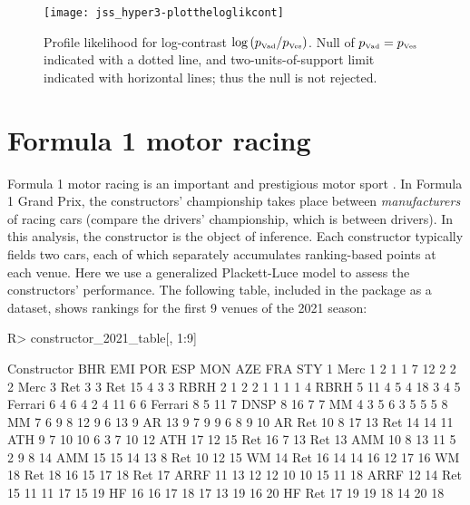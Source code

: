 \documentclass[article]{jss}
\begin{document}
\begin{figure}[t!]
\centering
\texttt{[image: jss\_hyper3-plottheloglikcont]}
\caption{Profile \label{profliklogcont} likelihood for log-contrast
$\log\left(p_{\mbox{\tiny Vad}}/ p_{\mbox{\tiny Ves}}\right)$.  Null
of $p_{\mbox{\tiny Vad}}=p_{\mbox{\tiny Ves}}$ indicated with a dotted
line, and two-units-of-support limit indicated with horizontal lines;
thus the null is not rejected.}
\end{figure}

\section{Formula 1 motor racing}\label{f1}

Formula 1 motor racing is an important and prestigious motor sport
\citep{codling2017,jenkins2010}.  In Formula 1 Grand Prix, the
constructors' championship takes place between {\em manufacturers} of
racing cars (compare the drivers' championship, which is between
drivers).  In this analysis, the constructor is the object of
inference.  Each constructor typically fields two cars, each of which
separately accumulates ranking-based points at each venue.  Here we
use a generalized Plackett-Luce model to assess the constructors'
performance.  The following table, included in the 
package as a dataset, shows rankings for the first 9 venues of the
2021 season:
%
\begin{Schunk}
\begin{Sinput}
R> constructor_2021_table[, 1:9]
\end{Sinput}
\begin{Soutput}
   Constructor BHR EMI POR ESP  MON AZE FRA STY
1         Merc   1   2   1   1    7  12   2   2
2         Merc   3 Ret   3   3  Ret  15   4   3
3         RBRH   2   1   2   2    1   1   1   1
4         RBRH   5  11   4   5    4  18   3   4
5      Ferrari   6   4   6   4    2   4  11   6
6      Ferrari   8   5  11   7 DNSP   8  16   7
7           MM   4   3   5   6    3   5   5   5
8           MM   7   6   9   8   12   9   6  13
9           AR  13   9   7   9    9   6   8   9
10          AR Ret  10   8  17   13 Ret  14  14
11         ATH   9   7  10  10    6   3   7  10
12         ATH  17  12  15 Ret   16   7  13 Ret
13         AMM  10   8  13  11    5   2   9   8
14         AMM  15  15  14  13    8 Ret  10  12
15          WM  14 Ret  16  14   14  16  12  17
16          WM  18 Ret  18  16   15  17  18 Ret
17        ARRF  11  13  12  12   10  10  15  11
18        ARRF  12  14 Ret  15   11  11  17  15
19          HF  16  16  17  18   17  13  19  16
20          HF Ret  17  19  19   18  14  20  18
\end{Soutput}
\end{Schunk}
\end{document}
